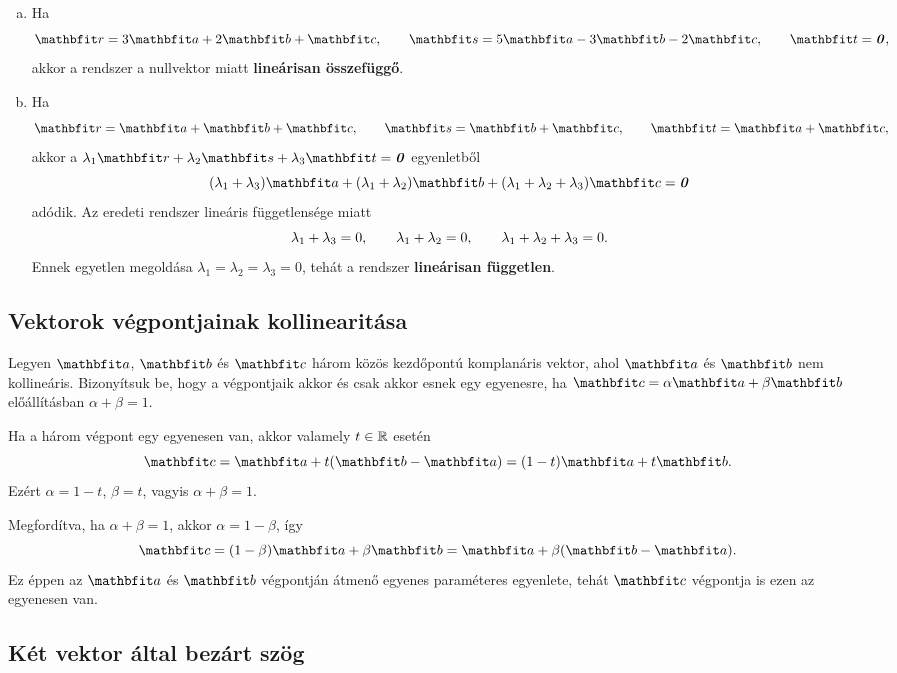 \documentclass{szb-solution}
\begin{document}
\begin{enumerate}[a)]
  \item Ha
        $$
          \rvec r=3\rvec a+2\rvec b+\rvec c,
          \qquad
          \rvec s=5\rvec a-3\rvec b-2\rvec c,
          \qquad
          \rvec t=\nvec,
        $$
        akkor a rendszer a nullvektor miatt
        \textbf{lineárisan összefüggő}.

  \item Ha
        $$
          \rvec r=\rvec a+\rvec b+\rvec c,
          \qquad
          \rvec s=\rvec b+\rvec c,
          \qquad
          \rvec t=\rvec a+\rvec c,
        $$
        akkor a
        $\lambda_1\rvec r+\lambda_2\rvec s+\lambda_3\rvec t=\nvec$
        egyenletből
        $$
          (\lambda_1+\lambda_3)\rvec a
          +(\lambda_1+\lambda_2)\rvec b
          +(\lambda_1+\lambda_2+\lambda_3)\rvec c=\nvec
        $$
        adódik. Az eredeti rendszer lineáris függetlensége miatt
        $$
          \lambda_1+\lambda_3=0,
          \qquad
          \lambda_1+\lambda_2=0,
          \qquad
          \lambda_1+\lambda_2+\lambda_3=0
          \text.
        $$
        Ennek egyetlen megoldása
        $\lambda_1=\lambda_2=\lambda_3=0$, tehát a rendszer
        \textbf{lineárisan független}.
\end{enumerate}

\subsection{Vektorok végpontjainak kollinearitása}

Legyen $\rvec a$, $\rvec b$ és $\rvec c$ három közös kezdőpontú komplanáris
vektor, ahol $\rvec a$ és $\rvec b$ nem kollineáris. Bizonyítsuk be, hogy a
végpontjaik akkor és csak akkor esnek egy egyenesre, ha
$\rvec c=\alpha\rvec a+\beta\rvec b$ előállításban $\alpha+\beta=1$.

Ha a három végpont egy egyenesen van, akkor valamely $t\in\mathbb{R}$ esetén
$$
  \rvec c=\rvec a+t(\rvec b-\rvec a)
  =(1-t)\rvec a+t\rvec b
  \text.
$$
Ezért $\alpha=1-t$, $\beta=t$, vagyis $\alpha+\beta=1$.

Megfordítva, ha $\alpha+\beta=1$, akkor $\alpha=1-\beta$, így
$$
  \rvec c=(1-\beta)\rvec a+\beta\rvec b
  =\rvec a+\beta(\rvec b-\rvec a)
  \text.
$$
Ez éppen az $\rvec a$ és $\rvec b$ végpontján átmenő egyenes paraméteres
egyenlete, tehát $\rvec c$ végpontja is ezen az egyenesen van.

\subsection{Két vektor által bezárt szög}
\end{document}

